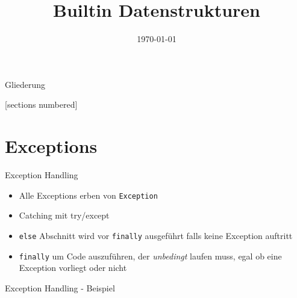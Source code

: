 



\title{Builtin Datenstrukturen}
\date{\today}




\maketitle

\begin{frame}{Gliederung}
	\begin{multicols}{2}
		[sections numbered]
		\tableofcontents
	\end{multicols}
\end{frame}


\section{Exceptions}

\begin{frame}{Exception Handling}
	\begin{itemize}
		\item Alle Exceptions erben von \alert{\texttt{Exception}}
		\item Catching mit try/except
		\item \alert{\texttt{else}} Abschnitt wird vor \alert{\texttt{finally}} ausgeführt falls keine Exception auftritt
		\item \alert{\texttt{finally}} um Code auszuführen, der \textit{unbedingt} laufen muss, egal ob eine Exception vorliegt oder nicht
	\end{itemize}
\end{frame}

\begin{frame}{Exception Handling - Beispiel}
    
\end{frame}


